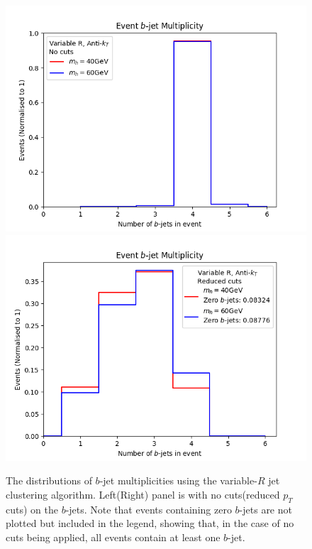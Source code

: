 \documentclass[12pt]{article}
\begin{document}
\begin{figure}[htb!]
	\includegraphics[scale=0.5]{plots/nbjets_varR_nocuts.png}
	\includegraphics[scale=0.5]{plots/nbjets_varR_lowptcut.png}
	\caption{The distributions of $b$-jet multiplicities using the {variable-$R$} jet clustering algorithm. Left(Right) panel is with
no cuts(reduced $p_T$ cuts) on the $b$-jets. Note that events containing zero $b$-jets are not plotted but included in the legend, showing that,
 in the case of no cuts being applied, all events contain at least one $b$-jet.}
\label{fig:nbjets_varR}
\end{figure}
\end{document}
